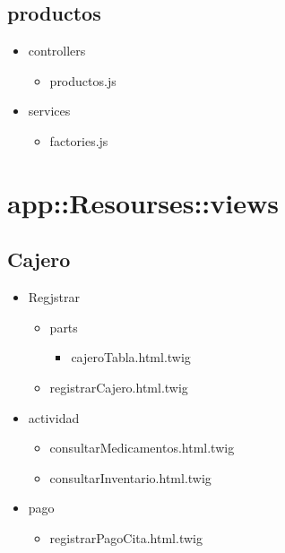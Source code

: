 	\subsection{productos}
		\begin{itemize}
			\item controllers
			\begin{itemize}
				\item productos.js
			\end{itemize}
			\item services
			\begin{itemize}
				\item factories.js
			\end{itemize}
		\end{itemize}
	
	
	
	\section{app::Resourses::views}
		\subsection{Cajero}
		\begin{itemize}
			\item Regjstrar
			\begin{itemize}
				\item parts
				\begin{itemize}
					\item cajeroTabla.html.twig
				\end{itemize}
				\item registrarCajero.html.twig
			\end{itemize}
			\item actividad
			\begin{itemize}
				\item consultarMedicamentos.html.twig
				\item consultarInventario.html.twig
			\end{itemize}
			\item pago
			\begin{itemize}
				\item registrarPagoCita.html.twig
			\end{itemize}
		\end{itemize}
		
